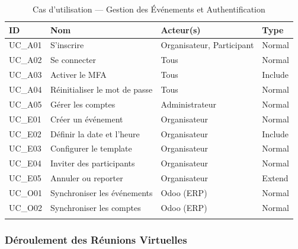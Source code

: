 \begin{longtable}{|m{1.5cm}|m{5cm}|m{4cm}|m{2cm}|}
\hline
\textbf{ID} & \textbf{Nom} & \textbf{Acteur(s)} & \textbf{Type} \\
\hline
\endhead
\endfoot
\endlastfoot
\hline
UC\_A01 & S'inscrire & Organisateur, Participant & Normal \\
\hline
UC\_A02 & Se connecter & Tous & Normal \\
\hline
UC\_A03 & Activer le MFA & Tous & Include \\
\hline
UC\_A04 & Réinitialiser le mot de passe & Tous & Normal \\
\hline
UC\_A05 & Gérer les comptes & Administrateur & Normal \\
\hline
UC\_E01 & Créer un événement & Organisateur & Normal \\
\hline
UC\_E02 & Définir la date et l'heure & Organisateur & Include \\
\hline
UC\_E03 & Configurer le template & Organisateur & Normal \\
\hline
UC\_E04 & Inviter des participants & Organisateur & Normal \\
\hline
UC\_E05 & Annuler ou reporter & Organisateur & Extend \\
\hline
UC\_O01 & Synchroniser les événements & Odoo (ERP) & Normal \\
\hline
UC\_O02 & Synchroniser les comptes & Odoo (ERP) & Normal \\
\hline
\captionsetup{justification=centering,margin=2cm}
\caption{Cas d'utilisation — Gestion des Événements et Authentification}
\label{tab:uc_events}
\end{longtable}

\subsubsection{Déroulement des Réunions Virtuelles}

